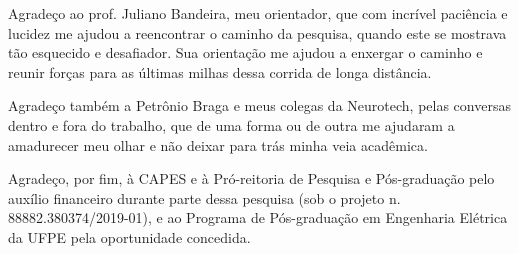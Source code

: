 Agrade\c co ao prof. Juliano Bandeira, meu orientador, que com incr\'ivel paci\^encia e lucidez me ajudou a reencontrar o caminho da pesquisa, quando este se mostrava t\~ao esquecido e desafiador. Sua orienta\c c\~ao me ajudou a enxergar o caminho e reunir for\c cas para as \'ultimas milhas dessa corrida de longa dist\^ancia.

Agrade\c co tamb\'em a Petr\^onio Braga e meus colegas da Neurotech, pelas conversas dentro e fora do trabalho, que de uma forma ou de outra me ajudaram a amadurecer meu olhar e n\~ao deixar para tr\'as minha veia acad\^emica.

Agrade\c co, por fim, \`a CAPES e \`a Pr\'o-reitoria de Pesquisa e P\'os-gradua\c c\~ao pelo aux\'ilio financeiro durante parte dessa pesquisa (sob o projeto n. 88882.380374/2019-01), e ao Programa de P\'os-gradua\c c\~ao em Engenharia El\'etrica da UFPE pela oportunidade concedida.
